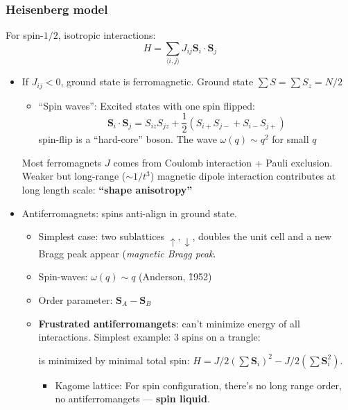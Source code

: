 \documentclass[11pt,letterpaper]{article}
\numberwithin{equation}{section} %
\renewcommand*{\vec}[1]{\bm{#1}}
\newcommand{\spind}{\ensuremath{\downarrow}}
\newcommand{\spinu}{\ensuremath{\uparrow}}
\begin{document}
\subsubsection{Heisenberg model}
\label{ssub:Heisenberg_model}
For spin-$1/2$, isotropic interactions: 
\begin{equation}
  H = \sum_{\langle i,j\rangle}J_{ij}\vec S_i\cdot\vec S_j
\end{equation}
\begin{itemize}
  \item If $J_{ij}<0$, ground state is ferromagnetic. Ground state $\sum S =
	  \sum S_z = N/2$
	\begin{itemize}
	  \item ``Spin waves'': Excited states with one spin flipped: 
		  \begin{equation}
			  \vec S_i\cdot\vec S_j = S_{iz}S_{jz} + \frac 12 \left( 
			  S_{i+}S_{j-}+S_{i-}S_{j+}\right)
		  \end{equation}
		  spin-flip is a ``hard-core'' boson. The wave $\omega(q)\sim q^2$
		  for small $q$
	\end{itemize}
	Most ferromagnets $J$ comes from Coulomb interaction + Pauli exclusion.
	Weaker but long-range ($\sim 1/t^3$) magnetic dipole interaction contributes
	at long length scale: \textbf{``shape anisotropy''} 
  \item Antiferromagnets: spins anti-align in ground state. 
	  \begin{itemize}
	    \item Simplest case: two sublattices $\spinu, \spind$, doubles the
			unit cell and a new Bragg peak appear (\emph{magnetic Bragg peak}. 
		\item Spin-waves: $\omega(q)\sim q$ (Anderson, \~ 1952)
		\item Order parameter: $\vec S_A - \vec S_B$
		\item \textbf{Frustrated antiferromangets}: can't minimize energy of
			all interactions. Simplest example: 3 spins on a trangle: 
			\begin{center}
			\end{center}
			is minimized by minimal total spin: $H=J/2 (\sum \vec S_i)^2 -
		J/2 (\sum \vec S_i^2)$. 
		\begin{itemize}
		  \item Kagome lattice: For spin configuration, there's no long range
			  order, no antiferromangets --- \textbf{spin liquid}.
		\end{itemize}
	\end{itemize}
\end{itemize}
\end{document}
